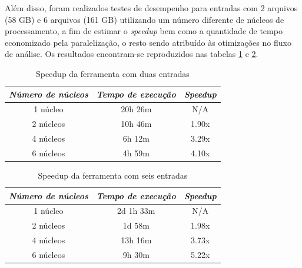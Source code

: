 \documentclass[cic,tc]{iiufrgs}
\begin{document}
Além disso, foram realizados testes de desempenho para entradas com 2 arquivos
(58 GB) e 6 arquivos (161 GB) utilizando um número diferente de núcleos de
processamento, a fim de estimar o \textit{speedup} bem como a quantidade de
tempo economizado pela paralelização, o resto sendo atribuído às otimizações no
fluxo de análise. Os resultados encontram-se reproduzidos nas tabelas
\ref{tbl:speedup2} e \ref{tbl:speedup6}.

\begin{table}[h]
    \caption{Speedup da ferramenta com duas entradas}
    \centering
        \begin{tabular}{c|c|c}
          \hline
          \textit{Número de núcleos}  &   \textit{Tempo de execução}  & \textit{Speedup} \\
          \hline
          \hline
          1 núcleo & 20h 26m & N/A \\
          2 núcleos & 10h 46m & 1.90x \\
          4 núcleos & 6h 12m & 3.29x \\
          6 núcleos & 4h 59m & 4.10x \\
          \hline
        \end{tabular}
    \label{tbl:speedup2}
\end{table}

\begin{table}[h]
    \caption{Speedup da ferramenta com seis entradas}
    \centering
        \begin{tabular}{c|c|c}
          \hline
          \textit{Número de núcleos}  &   \textit{Tempo de execução}  & \textit{Speedup} \\
          \hline
          \hline
          1 núcleo & 2d 1h 33m & N/A \\
          2 núcleos & 1d 58m & 1.98x \\
          4 núcleos & 13h 16m & 3.73x \\
          6 núcleos & 9h 30m & 5.22x \\
          \hline
        \end{tabular}
    \label{tbl:speedup6}
\end{table}
\end{document}
